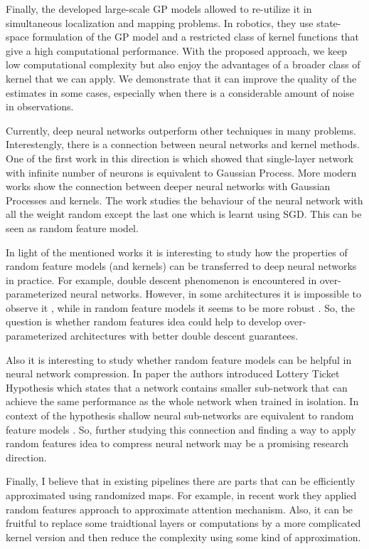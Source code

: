 Finally, the developed large-scale GP models allowed to re-utilize it
in simultaneous localization and mapping problems.
In robotics, they use state-space formulation of the GP model and a restricted
class of kernel functions that give a high computational performance.
With the proposed approach, we keep low computational complexity
but also enjoy the advantages of a broader class of kernel that we can apply.
We demonstrate that it can improve the quality of the estimates in some cases,
especially when there is a considerable amount of noise in observations.






Currently, deep neural networks outperform other techniques in many
problems.
Interestengly, there is a connection between neural networks
and kernel methods.
One of the first work in this direction is \citep{williams1996computing} which
showed that single-layer network with infinite number of neurons is equivalent
to Gaussian Process.
More modern works \citep{lee2017deep,jacot2018neural} show the connection
between deeper neural networks with Gaussian Processes and kernels.
The work \citep{daniely2017sgd} studies the behaviour of the
neural network with all the weight random except the last one which
is learnt using SGD.
This can be seen as random feature model.

In light of the mentioned works it is interesting to study how the properties
of random feature models (and kernels) can be transferred
to deep neural networks in practice.
For example, double descent phenomenon is encountered in over-parameterized
neural networks.
However, in some architectures it is impossible to observe it \citep{ba2019generalization},
while in random feature models it seems to be more robust \citep{mei2019generalization}.
So, the question is whether random features idea could help to develop
over-parameterized architectures with better double descent guarantees.

Also it is interesting to study whether random feature models can be helpful
in neural network compression.
In paper \citep{frankle2018lottery} the authors introduced Lottery Ticket Hypothesis
which states that a network contains smaller sub-network that can achieve
the same performance as the whole network when trained in isolation.
In context of the hypothesis shallow neural sub-networks are equivalent
to random feature models \citep{malach2020proving}.
So, further studying this connection and finding a way to apply
random features idea to compress neural network may be a promising
research direction.

Finally, I believe that in existing pipelines there are parts that
can be efficiently approximated using randomized maps.
For example, in recent work \citep{choromanski2020rethinking} they applied
random features approach to approximate attention mechanism.
Also, it can be fruitful to replace some traidtional layers or computations
by a more complicated kernel version and then reduce the complexity
using some kind of approximation.









